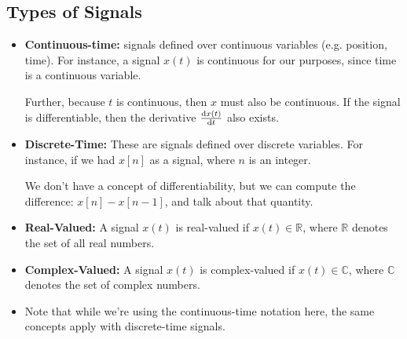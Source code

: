 \subsection{Types of Signals}
\begin{itemize}
	\item \textbf{Continuous-time:} signals defined over continuous variables (e.g. position, time). For 
		instance, a signal \( x(t) \) is continuous for our purposes, since time is a continuous variable. 

		Further, because \( t \) is continuous, then \( x \) must also be continuous.  If the signal is differentiable, 
		then the derivative \( \dv{x(t)}{t} \) also exists. 

	\item \textbf{Discrete-Time:} These are signals defined over discrete variables. For instance, if we had 
		\( x[n] \) as a signal, where \( n \) is an integer. 

		We don't have a concept of differentiability, but we can compute the difference: \( x[n] - x[n- 1] \), and 
		talk about that quantity. 
	\item \textbf{Real-Valued:} A signal \( x(t) \) is real-valued if \( x(t) \in \mathbb R \), where \( \mathbb R \) 
		denotes the set of all real numbers. 
	\item \textbf{Complex-Valued:} A signal \( x(t)  \) is complex-valued if \( x(t) \in \mathbb C \), where 
		\( \mathbb C \) denotes the set of complex numbers. 
	\item Note that while we're using the continuous-time notation here, the same concepts apply with discrete-time 
		signals. 


\end{itemize}
